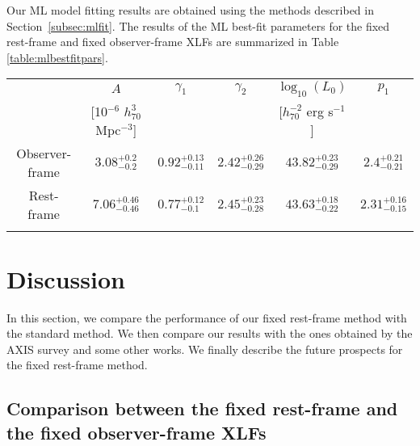 \documentclass[fleqn,usenatbib]{mnras}
\begin{document}
Our ML model fitting results are obtained using the methods described in Section~\ref{subsec:mlfit}.
The results of the ML best-fit parameters for the fixed rest-frame and fixed observer-frame XLFs are summarized in Table \ref{table:mlbestfitpars}.
    
    \begin{table*}
	\caption{PLE best-fit parameters for the X-ray luminosity functions in the fixed observer-frame and fixed rest-frame 2$-$8 keV bands.}
	\centering
	    \setlength{\extrarowheight}{7pt}
    	\begin{tabular}{cccccc}
    	\hline
                        &                                 $A$ &              $\gamma_1$ &              $\gamma_2$ &            $\log_{10}(L_{0})$ &                   $p_1$ \\
                        & [10$^{-6}$ $h^{3}_{70}$ Mpc$^{-3}$] &                         &                         & [$h^{-2}_{70}$ erg s$^{-1}$] &                         \\
        \addlinespace[4pt]
        \hline
         Observer-frame &              $3.08^{+0.2}_{-0.2}$   &  $0.92^{+0.13}_{-0.11}$ &  $2.42^{+0.26}_{-0.29}$ &      $43.82^{+0.23}_{-0.29}$ &   $2.4^{+0.21}_{-0.21}$ \\
             Rest-frame &              $7.06^{+0.46}_{-0.46}$ &   $0.77^{+0.12}_{-0.1}$ &  $2.45^{+0.23}_{-0.28}$ &      $43.63^{+0.18}_{-0.22}$ &  $2.31^{+0.16}_{-0.15}$ \\
        \addlinespace[4pt]
        \hline
    	\label{table:mlbestfitpars}
    	\end{tabular}
	\end{table*}


\section{Discussion}\label{sec:discussion}

In this section, we compare the performance of our fixed rest-frame method with the standard method.
We then compare our results with the ones obtained by the AXIS survey and some other works.
We finally describe the future prospects for the fixed rest-frame method.


	\subsection{Comparison between the fixed rest-frame and the fixed observer-frame XLFs}\label{subsec:rfvsobf}  
    
\end{document}
